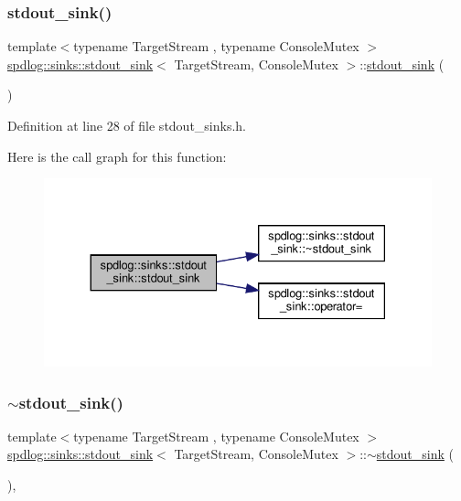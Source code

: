 \subsubsection{\texorpdfstring{stdout\+\_\+sink()}{stdout\_sink()}\hspace{0.1cm}{\footnotesize\ttfamily [1/2]}}
{\footnotesize\ttfamily template$<$typename Target\+Stream , typename Console\+Mutex $>$ \\
\hyperlink{classspdlog_1_1sinks_1_1stdout__sink}{spdlog\+::sinks\+::stdout\+\_\+sink}$<$ Target\+Stream, Console\+Mutex $>$\+::\hyperlink{classspdlog_1_1sinks_1_1stdout__sink}{stdout\+\_\+sink} (\begin{DoxyParamCaption}{ }\end{DoxyParamCaption})\hspace{0.3cm}{\ttfamily [inline]}}



Definition at line 28 of file stdout\+\_\+sinks.\+h.

Here is the call graph for this function\+:
\nopagebreak
\begin{figure}[H]
\begin{center}
\leavevmode
\includegraphics[width=330pt]{classspdlog_1_1sinks_1_1stdout__sink_aadb52e8ba9e2992f847c46ec521b4407_cgraph}
\end{center}
\end{figure}
\mbox{\label{classspdlog_1_1sinks_1_1stdout__sink_ae0e434d7d55f6ec9c05ff308bc8e673b}} 
\subsubsection{\texorpdfstring{$\sim$stdout\+\_\+sink()}{~stdout\_sink()}}
{\footnotesize\ttfamily template$<$typename Target\+Stream , typename Console\+Mutex $>$ \\
\hyperlink{classspdlog_1_1sinks_1_1stdout__sink}{spdlog\+::sinks\+::stdout\+\_\+sink}$<$ Target\+Stream, Console\+Mutex $>$\+::$\sim$\hyperlink{classspdlog_1_1sinks_1_1stdout__sink}{stdout\+\_\+sink} (\begin{DoxyParamCaption}{ }\end{DoxyParamCaption})\hspace{0.3cm}{\ttfamily [override]}, {\ttfamily [default]}}


